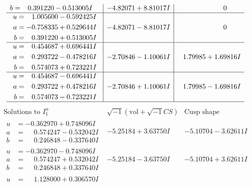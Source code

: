 \documentclass[1p]{elsarticle_modified}
\theoremstyle{definition}
\newcommand{\I}{\sqrt{-1}}
\begin{document}
$$\begin{array}{c|c|c}
\begin{aligned}
b &= \phantom{-}0.391220 - 0.513005 I\end{aligned}
 & -4.82071 + 8.81017 I & \phantom{-0.000000 } 0 \\ \hline\begin{aligned}
u &= \phantom{-}1.005600 - 0.592425 I \\
a &= -0.758335 + 0.529644 I \\
b &= \phantom{-}0.391220 + 0.513005 I\end{aligned}
 & -4.82071 - 8.81017 I & \phantom{-0.000000 } 0 \\ \hline\begin{aligned}
u &= \phantom{-}0.454687 + 0.696441 I \\
a &= \phantom{-}0.293722 - 0.478216 I \\
b &= \phantom{-}0.574073 + 0.723221 I\end{aligned}
 & -2.70846 - 1.10061 I & \phantom{-}1.79985 + 1.69816 I \\ \hline\begin{aligned}
u &= \phantom{-}0.454687 - 0.696441 I \\
a &= \phantom{-}0.293722 + 0.478216 I \\
b &= \phantom{-}0.574073 - 0.723221 I\end{aligned}
 & -2.70846 + 1.10061 I & \phantom{-}1.79985 - 1.69816 I\\
 \hline 
 \end{array}$$\newpage$$\begin{array}{c|c|c}  
\text{Solutions to }I^u_{1}& \I (\text{vol} + \sqrt{-1}CS) & \text{Cusp shape}\\
 \hline 
\begin{aligned}
u &= -0.362970 + 0.748096 I \\
a &= \phantom{-}0.574247 - 0.532042 I \\
b &= \phantom{-}0.246848 - 0.337640 I\end{aligned}
 & -5.25184 + 3.63750 I & -5.10704 - 3.62611 I \\ \hline\begin{aligned}
u &= -0.362970 - 0.748096 I \\
a &= \phantom{-}0.574247 + 0.532042 I \\
b &= \phantom{-}0.246848 + 0.337640 I\end{aligned}
 & -5.25184 - 3.63750 I & -5.10704 + 3.62611 I \\ \hline\begin{aligned}
u &= \phantom{-}1.128000 + 0.306570 I \\

\end{aligned}
\end{array}$$
\end{document}
